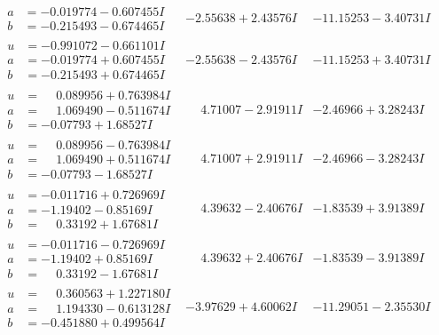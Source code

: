 \documentclass[1p]{elsarticle_modified}
\theoremstyle{definition}
\begin{document}
$$\begin{array}{c|c|c}
\begin{aligned}
a &= -0.019774 - 0.607455 I \\
b &= -0.215493 - 0.674465 I\end{aligned}
 & -2.55638 + 2.43576 I & -11.15253 - 3.40731 I \\ \hline\begin{aligned}
u &= -0.991072 - 0.661101 I \\
a &= -0.019774 + 0.607455 I \\
b &= -0.215493 + 0.674465 I\end{aligned}
 & -2.55638 - 2.43576 I & -11.15253 + 3.40731 I \\ \hline\begin{aligned}
u &= \phantom{-}0.089956 + 0.763984 I \\
a &= \phantom{-}1.069490 - 0.511674 I \\
b &= -0.07793 + 1.68527 I\end{aligned}
 & \phantom{-}4.71007 - 2.91911 I & -2.46966 + 3.28243 I \\ \hline\begin{aligned}
u &= \phantom{-}0.089956 - 0.763984 I \\
a &= \phantom{-}1.069490 + 0.511674 I \\
b &= -0.07793 - 1.68527 I\end{aligned}
 & \phantom{-}4.71007 + 2.91911 I & -2.46966 - 3.28243 I \\ \hline\begin{aligned}
u &= -0.011716 + 0.726969 I \\
a &= -1.19402 - 0.85169 I \\
b &= \phantom{-}0.33192 + 1.67681 I\end{aligned}
 & \phantom{-}4.39632 - 2.40676 I & -1.83539 + 3.91389 I \\ \hline\begin{aligned}
u &= -0.011716 - 0.726969 I \\
a &= -1.19402 + 0.85169 I \\
b &= \phantom{-}0.33192 - 1.67681 I\end{aligned}
 & \phantom{-}4.39632 + 2.40676 I & -1.83539 - 3.91389 I \\ \hline\begin{aligned}
u &= \phantom{-}0.360563 + 1.227180 I \\
a &= \phantom{-}1.194330 - 0.613128 I \\
b &= -0.451880 + 0.499564 I\end{aligned}
 & -3.97629 + 4.60062 I & -11.29051 - 2.35530 I \\ \hline\begin{aligned}

\end{aligned}
\end{array}$$
\end{document}
